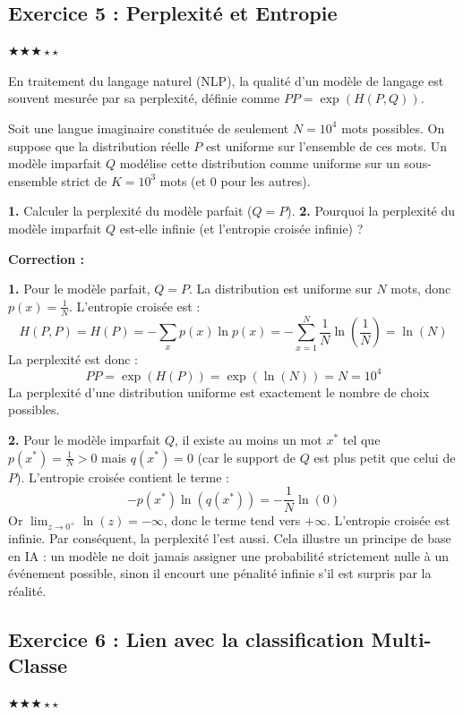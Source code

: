 \documentclass[11pt,a4paper]{article}
\begin{document}
\subsection*{Exercice 5 : Perplexité et Entropie }

$\bigstar\bigstar\bigstar\star\star$


En traitement du langage naturel (NLP), la qualité d'un modèle de langage est souvent mesurée par sa perplexité, définie comme $PP = \exp(H(P, Q))$.

Soit une langue imaginaire constituée de seulement $N=10^4$ mots possibles. On suppose que la distribution réelle $P$ est uniforme sur l'ensemble de ces mots. Un modèle imparfait $Q$ modélise cette distribution comme uniforme sur un sous-ensemble strict de $K=10^3$ mots (et 0 pour les autres).

\textbf{1.} Calculer la perplexité du modèle parfait ($Q=P$).
\textbf{2.} Pourquoi la perplexité du modèle imparfait $Q$ est-elle infinie (et l'entropie croisée infinie) ?

\textbf{Correction :}

\textbf{1.} Pour le modèle parfait, $Q=P$. La distribution est uniforme sur $N$ mots, donc $p(x) = \frac{1}{N}$.
L'entropie croisée est :
$$H(P, P) = H(P) = - \sum_{x} p(x) \ln p(x) = - \sum_{x=1}^{N} \frac{1}{N} \ln\left(\frac{1}{N}\right) = \ln(N)$$
La perplexité est donc :
$$PP = \exp(H(P)) = \exp(\ln(N)) = N = 10^4$$
La perplexité d'une distribution uniforme est exactement le nombre de choix possibles.

\textbf{2.} Pour le modèle imparfait $Q$, il existe au moins un mot $x^*$ tel que $p(x^*) = \frac{1}{N} > 0$ mais $q(x^*) = 0$ (car le support de $Q$ est plus petit que celui de $P$).
L'entropie croisée contient le terme :
$$- p(x^*) \ln(q(x^*)) = - \frac{1}{N} \ln(0)$$
Or $\lim_{z \to 0^+} \ln(z) = -\infty$, donc le terme tend vers $+\infty$.
L'entropie croisée est infinie. Par conséquent, la perplexité l'est aussi.
Cela illustre un principe de base en IA : un modèle ne doit jamais assigner une probabilité strictement nulle à un événement possible, sinon il encourt une pénalité infinie s'il est surpris par la réalité.


\subsection*{Exercice 6 : Lien avec la classification Multi-Classe }

$\bigstar\bigstar\bigstar\star\star$
\end{document}
